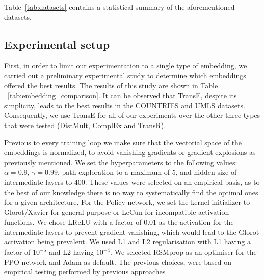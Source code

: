 Table~\ref{tab:datasets} contains a statistical summary of the aforementioned datasets.




\subsection{Experimental setup}


First, in order to limit our experimentation to a single type of embedding, we carried out a preliminary experimental study to determine which embeddings offered the best results. The results of this study are shown in Table ~\ref{tab:embedding_comparison}. It can be observed that TransE, despite its simplicity, leads to the best results in the COUNTRIES and UMLS datasets. Consequently, we use TransE for all of our experiments over the other three types that were tested (DistMult, ComplEx and TransR).

Previous to every training loop we make sure that the vectorial space of the embeddings is normalized, to avoid vanishing gradients or gradient explosions as previously mentioned. We set the hyperparameters to the following values: $\alpha=0.9$, $\gamma=0.99$, path exploration to a maximum of $5$, and hidden size of intermediate layers to $400$. These values were selected on an empirical basis, as to the best of our knowledge there is no way to systematically find the optimal ones for a given architecture.
For the Policy network, we set the kernel initializer to Glorot/Xavier
for general purpose or LeCun
for incompatible activation functions. We chose LReLU with a factor of $0.01$ as the activation for the intermediate layers to prevent gradient vanishing, which would lead to the Glorot activation being prevalent. We used L1 and L2 regularisation with L1 having a factor of $10^{-5}$ and L2 having $10^{-4}$. We selected RSMprop
as an optimiser for the PPO network and Adam
as default. The previous choices, were based on empirical testing performed by previous approaches


